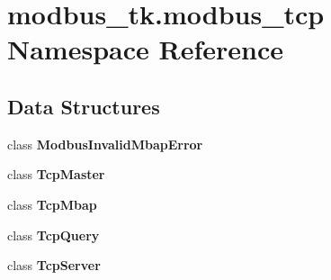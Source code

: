 \section{modbus\+\_\+tk.\+modbus\+\_\+tcp Namespace Reference}
\label{namespacemodbus__tk_1_1modbus__tcp}
\subsection*{Data Structures}
\begin{DoxyCompactItemize}
\item 
class {\bf Modbus\+Invalid\+Mbap\+Error}
\item 
class {\bf Tcp\+Master}
\item 
class {\bf Tcp\+Mbap}
\item 
class {\bf Tcp\+Query}
\item 
class {\bf Tcp\+Server}
\end{DoxyCompactItemize}

